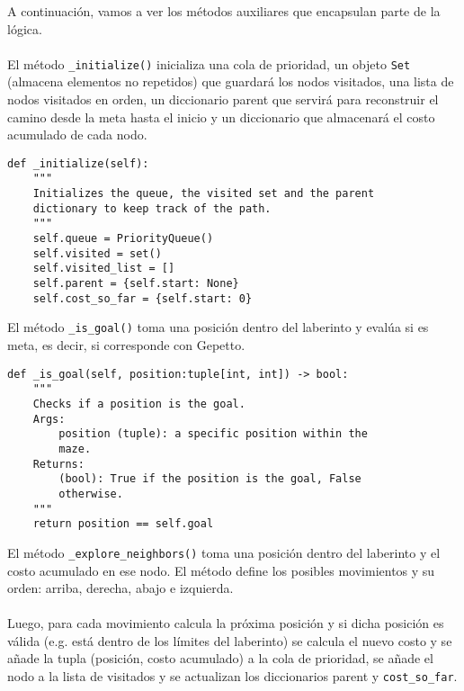 \clearpage
A continuación, vamos a ver los métodos auxiliares que encapsulan parte de la lógica.
\\\\
El método \lstinline{_initialize()} inicializa una cola de prioridad, un objeto \lstinline{Set} (almacena elementos no repetidos) que guardará los nodos visitados, una lista de nodos visitados en orden, un diccionario parent que servirá para reconstruir el camino desde la meta hasta el inicio y un diccionario que almacenará el costo acumulado de cada nodo.\\
\begin{lstlisting}
def _initialize(self):
    """
    Initializes the queue, the visited set and the parent
    dictionary to keep track of the path.
    """
    self.queue = PriorityQueue()
    self.visited = set()
    self.visited_list = []
    self.parent = {self.start: None}
    self.cost_so_far = {self.start: 0}

\end{lstlisting}
El método \lstinline{_is_goal()} toma una posición dentro del laberinto y evalúa si es meta, es decir, si corresponde con Gepetto.\\
\begin{lstlisting}
def _is_goal(self, position:tuple[int, int]) -> bool:
    """
    Checks if a position is the goal.
    Args:
        position (tuple): a specific position within the
        maze.
    Returns:
        (bool): True if the position is the goal, False
        otherwise.
    """
    return position == self.goal

\end{lstlisting}
\clearpage
El método \lstinline{_explore_neighbors()} toma una posición dentro del laberinto y el costo acumulado en ese nodo. El método define los posibles movimientos y su orden: arriba, derecha, abajo e izquierda.
\\\\
Luego, para cada movimiento calcula la próxima posición y si dicha posición es válida (e.g. está dentro de los límites del laberinto) se calcula el nuevo costo y se añade la tupla (posición, costo acumulado) a la cola de prioridad, se añade el nodo a la lista de visitados y se actualizan los diccionarios parent y \lstinline{cost_so_far}.\\

